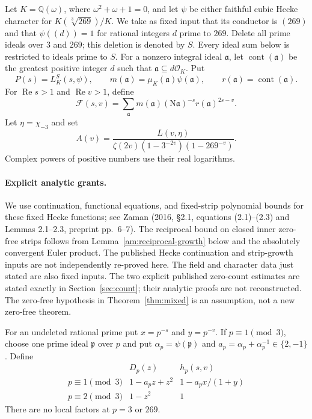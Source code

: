 \documentclass[11pt]{article}
\numberwithin{equation}{section}
\newcommand{\F}{\mathcal F}
\newcommand{\N}{\mathrm N}
\newcommand{\cont}{\operatorname{cont}}
\newcommand{\Rea}{\operatorname{Re}}
\begin{document}
Let $K=\mathbb Q(\omega)$, where $\omega^2+\omega+1=0$, and let
$\psi$ be either faithful cubic Hecke character for
$K(\sqrt[3]{269})/K$. We take as fixed input that its conductor is
$(269)$ and that $\psi((d))=1$ for rational integers $d$ prime to
$269$. Delete all prime ideals over $3$ and $269$; this deletion is
denoted by $S$. Every ideal sum below is restricted to ideals prime
to $S$. For a nonzero integral ideal $\mathfrak a$, let
$\cont(\mathfrak a)$ be the greatest positive integer $d$ such that
$\mathfrak a\subseteq d\mathcal O_K$. Put
\begin{equation}\label{eq:defs}
 P(s)=L_K^S(s,\psi),\qquad
 m(\mathfrak a)=\mu_K(\mathfrak a)\psi(\mathfrak a),\qquad
 r(\mathfrak a)=\cont(\mathfrak a).
\end{equation}
For $\Rea s>1$ and $\Rea v>1$, define
\begin{equation}\label{eq:F}
 \F(s,v)=\sum_{\mathfrak a}
 m(\mathfrak a)(\N\mathfrak a)^{-s}
 r(\mathfrak a)^{2s-v}.
\end{equation}
Let $\eta=\chi_{-3}$ and set
\begin{equation}\label{eq:A}
 A(v)=\frac{L(v,\eta)}
 {\zeta(2v)(1-3^{-2v})(1-269^{-v})}.
\end{equation}
Complex powers of positive numbers use their real logarithms.

\paragraph{Explicit analytic grants.}
We use continuation, functional equations, and fixed-strip polynomial
bounds for these fixed Hecke functions; see Zaman (2016, \S2.1,
equations (2.1)--(2.3) and Lemmas 2.1--2.3, preprint pp.~6--7).
The reciprocal bound on closed inner zero-free strips follows from
Lemma~\ref{am:reciprocal-growth} below and the absolutely convergent
Euler product. The published Hecke continuation and strip-growth
inputs are not independently re-proved here.
The field and character data just stated are also fixed inputs.
The two explicit published zero-count estimates are stated exactly
in Section~\ref{sec:count}; their analytic proofs are not reconstructed.
The zero-free hypothesis in Theorem~\ref{thm:mixed} is an assumption,
not a new zero-free theorem.

For an undeleted rational prime put $x=p^{-s}$ and $y=p^{-v}$.
If $p\equiv1\pmod3$, choose one prime ideal $\mathfrak p$ over $p$
and put $\alpha_p=\psi(\mathfrak p)$ and
$a_p=\alpha_p+\alpha_p^{-1}\in\{2,-1\}$. Define
\begin{equation}\label{eq:Dh}
\begin{array}{c|c|c}
 &D_p(z)&h_p(s,v)\\ \hline
p\equiv1\pmod3&1-a_pz+z^2&1-a_px/(1+y)\\[2pt]
p\equiv2\pmod3&1-z^2&1
\end{array}
\end{equation}
There are no local factors at $p=3$ or $269$.
\end{document}
